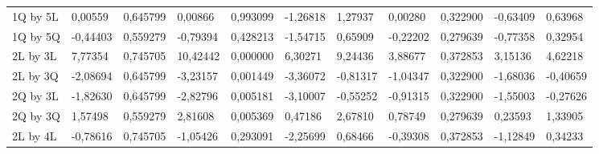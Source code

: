 \begin{table}[H]
{\begin{tabular}{lllllllllll}
\rowcolor[HTML]{FFFFFF} 
1Q by 5L       & {\color[HTML]{181A1B} 0,00559}  & {\color[HTML]{181A1B} 0,645799} & {\color[HTML]{181A1B} 0,00866}  & {\color[HTML]{181A1B} 0,993099} & {\color[HTML]{181A1B} -1,26818} & {\color[HTML]{181A1B} 1,27937}  & {\color[HTML]{181A1B} 0,00280}  & {\color[HTML]{181A1B} 0,322900} & {\color[HTML]{181A1B} -0,63409} & {\color[HTML]{181A1B} 0,63968}  \\
\rowcolor[HTML]{FFFFFF} 
1Q by 5Q       & {\color[HTML]{181A1B} -0,44403} & {\color[HTML]{181A1B} 0,559279} & {\color[HTML]{181A1B} -0,79394} & {\color[HTML]{181A1B} 0,428213} & {\color[HTML]{181A1B} -1,54715} & {\color[HTML]{181A1B} 0,65909}  & {\color[HTML]{181A1B} -0,22202} & {\color[HTML]{181A1B} 0,279639} & {\color[HTML]{181A1B} -0,77358} & {\color[HTML]{181A1B} 0,32954}  \\
\rowcolor[HTML]{FFFFFF} 
2L by 3L       & {\color[HTML]{FF0000} 7,77354}  & {\color[HTML]{FF0000} 0,745705} & {\color[HTML]{FF0000} 10,42442} & {\color[HTML]{FF0000} 0,000000} & {\color[HTML]{FF0000} 6,30271}  & {\color[HTML]{FF0000} 9,24436}  & {\color[HTML]{FF0000} 3,88677}  & {\color[HTML]{FF0000} 0,372853} & {\color[HTML]{FF0000} 3,15136}  & {\color[HTML]{FF0000} 4,62218}  \\
\rowcolor[HTML]{FFFFFF} 
2L by 3Q       & {\color[HTML]{FF0000} -2,08694} & {\color[HTML]{FF0000} 0,645799} & {\color[HTML]{FF0000} -3,23157} & {\color[HTML]{FF0000} 0,001449} & {\color[HTML]{FF0000} -3,36072} & {\color[HTML]{FF0000} -0,81317} & {\color[HTML]{FF0000} -1,04347} & {\color[HTML]{FF0000} 0,322900} & {\color[HTML]{FF0000} -1,68036} & {\color[HTML]{FF0000} -0,40659} \\
\rowcolor[HTML]{FFFFFF} 
2Q by 3L       & {\color[HTML]{FF0000} -1,82630} & {\color[HTML]{FF0000} 0,645799} & {\color[HTML]{FF0000} -2,82796} & {\color[HTML]{FF0000} 0,005181} & {\color[HTML]{FF0000} -3,10007} & {\color[HTML]{FF0000} -0,55252} & {\color[HTML]{FF0000} -0,91315} & {\color[HTML]{FF0000} 0,322900} & {\color[HTML]{FF0000} -1,55003} & {\color[HTML]{FF0000} -0,27626} \\
\rowcolor[HTML]{FFFFFF} 
2Q by 3Q       & {\color[HTML]{FF0000} 1,57498}  & {\color[HTML]{FF0000} 0,559279} & {\color[HTML]{FF0000} 2,81608}  & {\color[HTML]{FF0000} 0,005369} & {\color[HTML]{FF0000} 0,47186}  & {\color[HTML]{FF0000} 2,67810}  & {\color[HTML]{FF0000} 0,78749}  & {\color[HTML]{FF0000} 0,279639} & {\color[HTML]{FF0000} 0,23593}  & {\color[HTML]{FF0000} 1,33905}  \\
\rowcolor[HTML]{FFFFFF} 
2L by 4L       & {\color[HTML]{181A1B} -0,78616} & {\color[HTML]{181A1B} 0,745705} & {\color[HTML]{181A1B} -1,05426} & {\color[HTML]{181A1B} 0,293091} & {\color[HTML]{181A1B} -2,25699} & {\color[HTML]{181A1B} 0,68466}  & {\color[HTML]{181A1B} -0,39308} & {\color[HTML]{181A1B} 0,372853} & {\color[HTML]{181A1B} -1,12849} & {\color[HTML]{181A1B} 0,34233}  \\

\end{tabular}}
\end{table}
